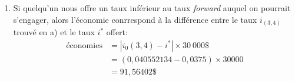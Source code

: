 \begin{enumerate}
\begin{enumerate}
  \item Si quelqu'un nous offre un taux inférieur au taux \emph{forward} auquel
  on pourrait s'engager, alors l'économie conrrespond à la différence entre le
  taux $i_(3,4)$ trouvé en a) et le taux $i^*$ offert:
  \begin{align*}
    \text{économies}  & = |i_0(3,4) - i^*| \times 30\ 000 \$ \\
                      & = (0,040552134 - 0,0375) \times 30000 \\
                      & = 91,56402\$ \\
  \end{align*}
\end{enumerate} %
\end{enumerate}
